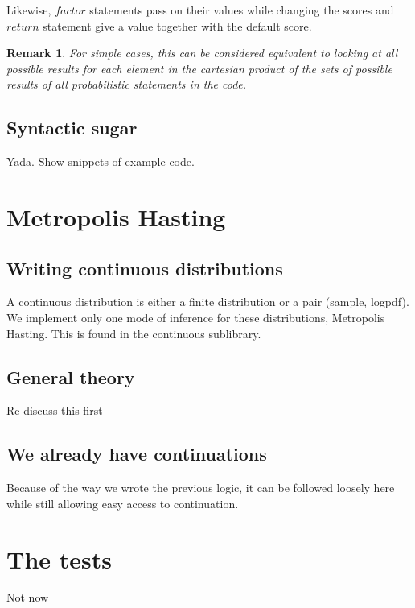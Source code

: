\documentclass{article}
\newcommand\SC[1]{{\color{violet}{\it \bf Simon :} #1}}
\newtheorem{remark}{Remark}
\begin{document}
	Likewise, $factor$ statements pass on their values while changing the scores and $return$ statement give a value together with the default score.

	\begin{remark}
	  For simple cases, this can be considered equivalent to looking at all possible results for each element in the cartesian product of the sets of possible results of all probabilistic statements in the code.
	\end{remark}

	\subsection{Syntactic sugar}
	\label{subseq:sugar}

	Yada. Show snippets of example code.

\section{Metropolis Hasting}

	\subsection{Writing continuous distributions}

	A continuous distribution is either a finite distribution or a pair (sample, logpdf).
	We implement only one mode of inference for these distributions, Metropolis Hasting.
	This is found in the continuous sublibrary.

	\subsection{General theory}

	\SC{Re-discuss this first}

	\subsection{We already have continuations}

	Because of the way we wrote the previous logic, it can be followed loosely here while still allowing easy access to continuation.


\section{The tests}

\SC{Not now}
\end{document}
